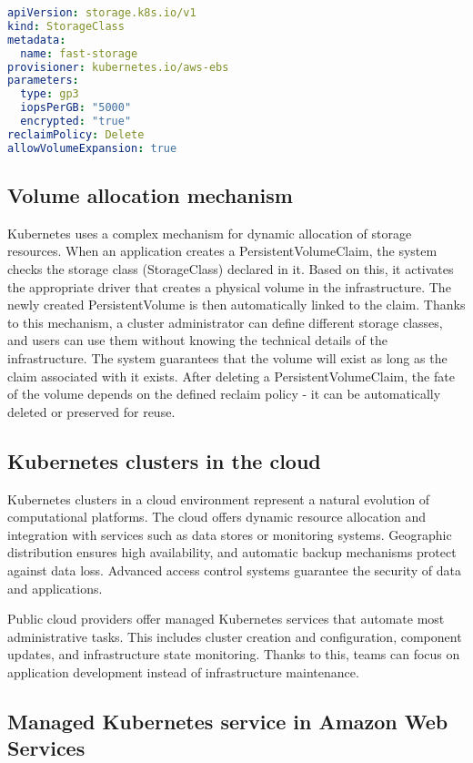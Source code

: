 \begin{lstlisting}[language=yaml,caption={Example StorageClass definition},label={lst:sc-example}]
apiVersion: storage.k8s.io/v1
kind: StorageClass
metadata:
  name: fast-storage
provisioner: kubernetes.io/aws-ebs
parameters:
  type: gp3
  iopsPerGB: "5000"
  encrypted: "true"
reclaimPolicy: Delete
allowVolumeExpansion: true
\end{lstlisting}

\subsection{Volume allocation mechanism}
Kubernetes uses a complex mechanism for dynamic allocation of storage resources.
When an application creates a PersistentVolumeClaim, the system checks the storage class (StorageClass) declared in it.
Based on this, it activates the appropriate driver that creates a physical volume in the infrastructure.
The newly created PersistentVolume is then automatically linked to the claim.
Thanks to this mechanism, a cluster administrator can define different storage classes, and users can use them without knowing the technical details of the infrastructure.
The system guarantees that the volume will exist as long as the claim associated with it exists.
After deleting a PersistentVolumeClaim, the fate of the volume depends on the defined reclaim policy - it can be automatically deleted or preserved for reuse.

\subsection{Kubernetes clusters in the cloud}

Kubernetes clusters in a cloud environment represent a natural evolution of computational platforms.
The cloud offers dynamic resource allocation and integration with services such as data stores or monitoring systems.
Geographic distribution ensures high availability, and automatic backup mechanisms protect against data loss.
Advanced access control systems guarantee the security of data and applications.

Public cloud providers offer managed Kubernetes services that automate most administrative tasks.
This includes cluster creation and configuration, component updates, and infrastructure state monitoring.
Thanks to this, teams can focus on application development instead of infrastructure maintenance.

\subsection{Managed Kubernetes service in Amazon Web Services}

